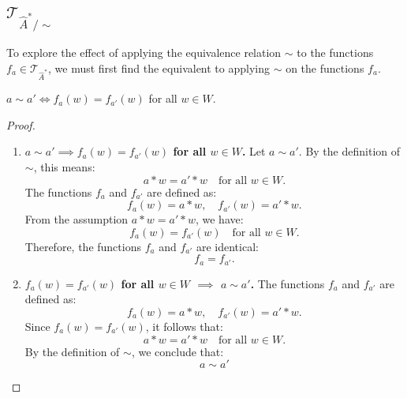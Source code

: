 \subsection{$\mathcal{T}_{\hat{A}^{\ast}/\sim}$}

To explore the effect of applying the equivalence relation $\sim$ to the functions $f_{a} \in \mathcal{T}_{\hat{A}^{\ast}}$, we must first find the equivalent to applying $\sim$ on the functions $f_{a}$.

\begin{proposition}\label{prp:equivalence_equivalence_on_functions}
    $a \sim a' \iff f_{a}(w) = f_{a'}(w)$ for all $w \in W$.
\end{proposition}
\begin{proof}
    \begin{enumerate}[(1)]
        \item \textbf{$a \sim a' \implies f_{a}(w) = f_{a'}(w)$ for all $w \in W$.}
              Let $a \sim a'$. By the definition of $\sim$, this means:
              \begin{equation}
                  a \ast w = a' \ast w \quad \text{for all } w \in W.
              \end{equation}
              The functions $f_{a}$ and $f_{a'}$ are defined as:
              \begin{equation}
                  f_{a}(w) = a \ast w, \quad f_{a'}(w) = a' \ast w.
              \end{equation}
              From the assumption $a \ast w = a' \ast w$, we have:
              \begin{equation}
                  f_{a}(w) = f_{a'}(w) \quad \text{for all } w \in W.
              \end{equation}
              Therefore, the functions $f_{a}$ and $f_{a'}$ are identical:
              \begin{equation}
                  f_{a} = f_{a'}.
              \end{equation}

        \item \textbf{$f_{a}(w) = f_{a'}(w)$ for all $w \in W$ $\implies$ $a \sim a'$.}
              The functions $f_{a}$ and $f_{a'}$ are defined as:
              \begin{equation}
                  f_{a}(w) = a \ast w, \quad f_{a'}(w) = a' \ast w.
              \end{equation}
              Since $f_{a}(w) = f_{a'}(w)$, it follows that:
              \begin{equation}
                  a \ast w = a' \ast w \quad \text{for all } w \in W.
              \end{equation}
              By the definition of $\sim$, we conclude that:
              \begin{equation}
                  a \sim a'
              \end{equation}


\end{enumerate}
\end{proof}
